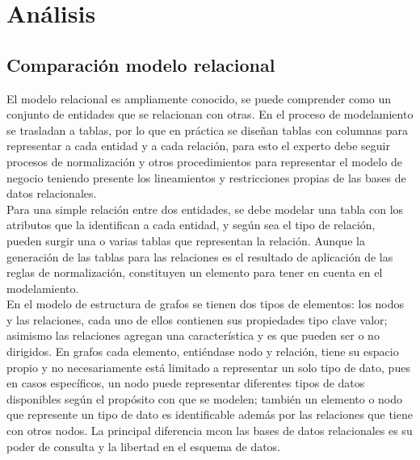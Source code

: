 \documentclass[preprint,12pt]{elsarticle}
\begin{document}
 



\section{Análisis}

\subsection{\textbf{Comparación modelo relacional}}
El modelo relacional es ampliamente conocido, se puede comprender como un conjunto de entidades que se relacionan con otras. En el proceso de modelamiento se trasladan a tablas, por lo que en práctica se diseñan tablas con columnas para representar a cada entidad y a cada relación, para esto el experto debe seguir procesos de normalización y otros procedimientos para representar el modelo de negocio teniendo presente los lineamientos y restricciones propias de las bases de datos relacionales.\\

Para una simple relación entre dos entidades, se debe modelar una tabla con los atributos que la identifican a cada entidad, y según sea el tipo de relación, pueden surgir una o varias tablas que representan la relación. Aunque la generación de las tablas para las relaciones es el resultado de aplicación de las reglas de normalización, constituyen un elemento para tener en cuenta en el modelamiento.\\

En el modelo de estructura de grafos se tienen dos tipos de elementos: los nodos y las relaciones, cada uno de ellos contienen sus propiedades tipo clave valor; asimismo las relaciones agregan una característica y es que pueden ser o no dirigidos. En grafos cada elemento, entiéndase nodo y relación, tiene su espacio propio y no necesariamente está limitado a representar un solo tipo de dato, pues en casos específicos, un nodo puede representar diferentes tipos de datos disponibles según el propósito con que se modelen; también un elemento o nodo que represente un tipo de dato es identificable además por las relaciones que tiene con otros nodos. La principal diferencia mcon las bases de datos relacionales es su poder de consulta y la libertad en el esquema de datos.\\
\end{document}
